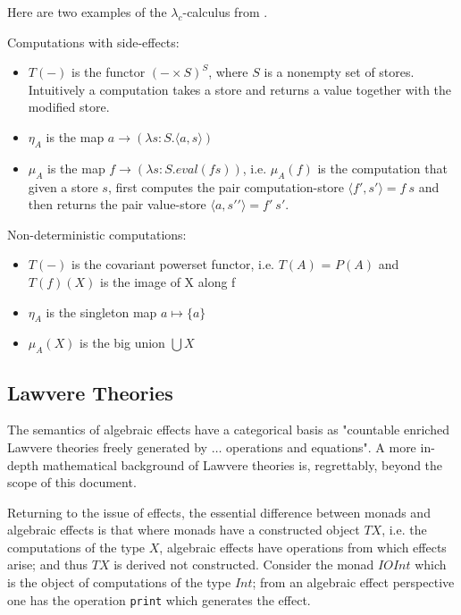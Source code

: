 Here are two examples of the $\lambda_c$-calculus from
\cite{moggi1989computational}\cite{moggi1991notions}.
\vspace{5mm}

\begin{example}\label{lc1}
\end{example}
    Computations with side-effects:
    \begin{itemize}
        \item $T(-)$ is the functor $(-\times S)^S$, where $S$ is a nonempty set of stores.
            Intuitively a computation takes a store and returns a value together with the modified store.
        \item $\eta_A$ is the map $a \rightarrow (\lambda s:S.\langle a,s \rangle)$
        \item $\mu_A$ is the map $f \rightarrow (\lambda s:S.eval(fs))$,
            i.e. $\mu_A(f)$ is the computation that given a store $s$,
            first computes the pair computation-store $\langle f\prime,s\prime\rangle = f\ s$
            and then returns the pair value-store $\langle a,s\prime\prime\rangle = f\prime\ s\prime$.
    \end{itemize}
\vspace{5mm}

\begin{example}
    Non-deterministic computations:
    \begin{itemize}
        \item $T(-)$ is the covariant powerset functor,
            i.e.  $T(A)$ = $P(A)$ and $T(f)(X)$ is the image of X along f
        \item $\eta_A$ is the singleton map $a \mapsto  \{a\}$
        \item $\mu_A(X)$ is the big union $\bigcup X$
    \end{itemize}
\end{example}

\subsection{Lawvere Theories}
The semantics of algebraic effects have a categorical basis as
"countable enriched Lawvere theories freely generated by $\dots$ operations and equations".
\cite{plotkin2004computational}
A more in-depth mathematical background of Lawvere theories is,
regrettably, beyond the scope of this document.

Returning to the issue of effects,
the essential difference between monads and algebraic effects is that
where monads have a constructed object $TX$,
i.e. the computations of the type $X$,
algebraic effects have operations from which effects arise;
and thus $TX$ is derived not constructed.
Consider the monad $IO Int$ which is the object of computations
of the type $Int$;
from an algebraic effect perspective
one has the operation \texttt{print} which generates the effect.\\


